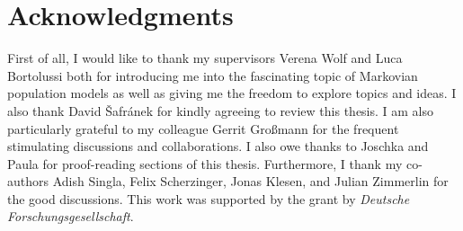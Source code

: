 



\vspace{3cm}

\begingroup
\let\clearpage\relax
\let\cleardoublepage\relax
\let\cleardoublepage\relax
\chapter*{Acknowledgments}
First of all, I would like to thank my supervisors Verena Wolf and Luca Bortolussi both for introducing me into the fascinating topic of Markovian population models as well as giving me the freedom to explore topics and ideas.
I also thank David Šafránek for kindly agreeing to review this thesis.
I am also particularly grateful to my colleague Gerrit Großmann for the frequent stimulating discussions and collaborations.
I also owe thanks to Joschka and Paula for proof-reading sections of this thesis.
Furthermore, I thank my co-authors Adish Singla, Felix Scherzinger, Jonas Klesen, and Julian Zimmerlin for the good discussions.
This work was supported by the  grant by \emph{Deutsche Forschungsgesellschaft}.



\endgroup
